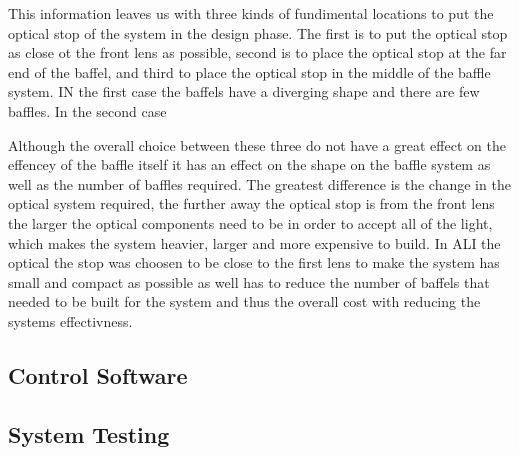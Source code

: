This information leaves us with three kinds of fundimental locations to put the optical stop of the system in the design phase. The first is to put the optical stop as close ot the front lens as possible, second is to place the optical stop at the far end of the baffel, and third to place the optical stop in the middle of the baffle system. IN the first case the baffels have a  diverging shape and there are few baffles. In the second case

Although the overall choice between these three do not have  a great effect on the effencey of the baffle itself it has an effect on the shape on the baffle system as well as the number of baffles required. The greatest difference is the change in the optical system required, the further away the optical stop is from the front lens the larger the optical components need to be in order to accept all of the light, which makes the system heavier, larger and more expensive to build. In ALI the optical the stop was choosen to be close to the first lens to make the system has small and compact as possible as well has to reduce the number of baffels that needed to be built for the system and thus the overall cost with reducing the systems effectivness.

\subsection{Control Software}

\subsection{System Testing}
